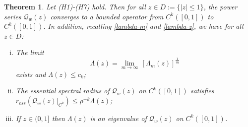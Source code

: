 \documentclass[11pt]{amsart}
\newtheorem{theorem}{Theorem}[section]
\theoremstyle{definition}
\theoremstyle{remark}
\theoremstyle{definition}
\numberwithin{equation}{section}
\newcommand{\QQ}{\mathcal{Q}}
\begin{document}
\begin{theorem} \label{thm:q-ck}
Let (H1)-(H7) hold. Then for all $z \in D := \{|z|\le 1\}$, the power series $\QQ_w(z)$ converges to a bounded operator from $C^k([0,1])$ to $C^k([0,1])$. In addition, recalling \eqref{lambda-m} and \eqref{lambda-z}, we have for all $z\in D$:
\begin{enumerate}[(i)]
\item The limit
\[
\Lambda(z) = \lim_{m\to \infty}\, [\Lambda_m(z)]^{\frac 1m}
\]
exists and $\Lambda(z)\le c_k$;
\item The essential spectral radius of $\QQ_w(z)$ on $C^k([0,1])$ satisfies $r_{ess}(\QQ_w(z)|_{C^k})\le \rho^{-k} \Lambda(z)$;
\item If $z\in (0,1]$ then $\Lambda(z)$ is an eigenvalue of $\QQ_w(z)$ on $C^k([0,1])$.
\end{enumerate}
\end{theorem}
\end{document}
